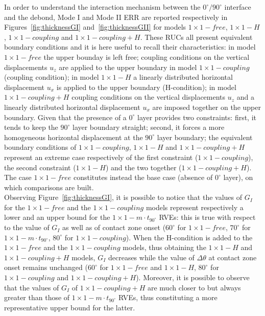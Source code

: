 \documentclass[Review,sagev,times]{sagej}
\begin{document}
In order to understand the interaction mechanism between the $0^{\circ}/90^{\circ}$ interface and the debond, Mode I and Mode II ERR are reported respectively in Figures~\ref{fig:thicknessGI} and~\ref{fig:thicknessGII} for models $1\times 1-free$, $1\times 1-H$, $1\times 1-coupling$ and $1\times 1-coupling+H$. These RUCs all present equivalent boundary conditions and it is here useful to recall their characteristics: in model $1\times 1-free$ the upper bounday is left free; coupling conditions on the vertical displacements $u_{z}$ are applied to the upper boundary in model $1\times 1-coupling$ (coupling condition); in model $1\times 1-H$ a linearly distributed horizontal displacement $u_{x}$ is applied to the upper boundary (H-condition); in model $1\times 1-coupling+H$ coupling conditions on the vertical displacements $u_{z}$ and a linearly distributed horizontal displacement $u_{x}$ are imposed together on the upper boundary. Given that the presence of a $0^{\circ}$ layer provides two constraints: first, it tends to keep the $90^{\circ}$ layer boundary straight; second, it forces a more homogeneous horizontal displacement at the $90^{\circ}$ layer boundary; the equivalent boundary conditions of $1\times 1-coupling$, $1\times 1-H$ and $1\times 1-coupling+H$ represent an extreme case respectively of the first constraint ($1\times 1-coupling$), the second constraint ($1\times 1-H$) and the two together ($1\times 1-coupling+H$). The case $1\times 1-free$ constitutes instead the base case (absence of $0^{\circ}$ layer), on which comparisons are built.\\
Observing Figure~\ref{fig:thicknessGI}, it is possible to notice that the values of $G_{I}$ for the $1\times 1-free$ and the $1\times 1-coupling$ models represent respectively a lower and an upper bound for the $1\times 1-m\cdot t_{90^{\circ}}$ RVEs: this is true with respect to the value of $G_{I}$ as well as of contact zone onset ($60^{\circ}$ for  $1\times 1-free$, $70^{\circ}$ for $1\times 1-m\cdot t_{90^{\circ}}$, $80^{\circ}$ for $1\times 1-coupling$). When the H-condition is added to the $1\times 1-free$ and the $1\times 1-coupling$ models, thus obtaining the $1\times 1-H$ and $1\times 1-coupling+H$ models, $G_{I}$ decreases while the value of $\Delta\theta$ at contact zone onset remains unchanged ($60^{\circ}$ for  $1\times 1-free$ and $1\times 1-H$, $80^{\circ}$ for $1\times 1-coupling$ and $1\times 1-coupling+H$). Moreover, it is possible to observe that the values of $G_{I}$ of $1\times 1-coupling+H$ are much closer to but always greater than those of $1\times 1-m\cdot t_{90^{\circ}}$ RVEs, thus constituting a more representative upper bound for the latter.\\
\end{document}
